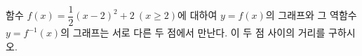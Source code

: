 함수 $f(x)=\dfrac{1}{2}(x-2)^2+2\ (x\ge 2)$에 대하여 $y=f(x)$의 그래프와 그 역함수 $y=f^{-1}(x)$의 그래프는 서로 다른 두 점에서 만난다. 이 두 점 사이의 거리를 구하시오.
